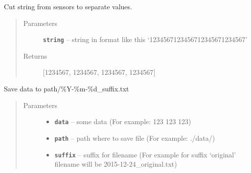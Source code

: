 \documentclass[12pt]{article}
\begin{document}
\begin{fulllineitems}
\label{index:calibration.parse_data_string}
Cut string from sensors to separate values.
\begin{quote}\begin{description}
\item[{Parameters}] \leavevmode
\textbf{\texttt{string}} -- string in format like this `1234567123456712345671234567'

\item[{Returns}] \leavevmode
{[}1234567, 1234567, 1234567, 1234567{]}

\end{description}\end{quote}

\end{fulllineitems}


\begin{fulllineitems}
\label{index:calibration.save_data}
Save data to path/\%Y-\%m-\%d\_suffix.txt
\begin{quote}\begin{description}
\item[{Parameters}] \leavevmode\begin{itemize}
\item {} 
\textbf{\texttt{data}} -- some data (For example: 123 123 123)

\item {} 
\textbf{\texttt{path}} -- path where to save file (For example: ./data/)

\item {} 
\textbf{\texttt{suffix}} -- suffix for filename (For example for suffix `original' filename
will be 2015-12-24\_original.txt)

\end{itemize}

\end{description}\end{quote}

\end{fulllineitems}

\label{index:module-generator}
\end{document}
